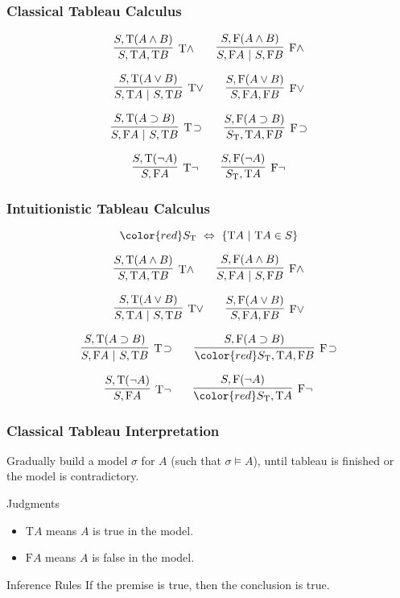 \documentclass[mathserif]{beamer}
\def\|{~|~}
\def\T{\textrm{T}}
\def\F{\textrm{F}}
\def\imp{\supset}
\def\dfn{~\Leftrightarrow~}
\newcommand{\diff}[1]{{\color{red} #1}}
\newcommand{\sat}[1]{\sigma \vDash #1}
\begin{document}
\begin{frame}
\frametitle{Classical Tableau Calculus}

$$
\infer
  [\T \land]
  {S , \T A , \T B}
{
  {S , \T(A \land B)}
}
\qquad
\infer
  [\F \land]
  {S, \F A \| S, \F B}
{
  {S, \F(A \land B)}
}
$$

$$
\infer
  [\T \lor]
  {S , \T A \| S , \T B}
{
  {S , \T(A \lor B)}
}
\qquad
\infer
  [\F \lor]
  {S, \F A , \F B}
{
  {S, \F(A \lor B)}
}
$$

$$
\infer
  [\T \! \imp]
  {S , \F A \| S , \T B}
{
  {S , \T(A \imp B)}
}
\qquad
\infer
  [\F \! \imp]
  {S_{\T}, \T A , \F B}
{
  {S, \F(A \imp B)}
}
$$

$$
\infer
  [\T \neg]
  {S , \F A}
{
  {S , \T(\neg A)}
}
\qquad
\infer
  [\F \neg]
  {S_{\T}, \T A}
{
  {S, \F(\neg A)}
}
$$

\end{frame}


\begin{frame}[label=calculus]
\frametitle{Intuitionistic Tableau Calculus}

$$
\diff{S_{\T} \dfn \{ \T A \| \T A \in S \}}
$$

$$
\infer
  [\T \land]
  {S , \T A , \T B}
{
  {S , \T(A \land B)}
}
\qquad
\infer
  [\F \land]
  {S, \F A \| S, \F B}
{
  {S, \F(A \land B)}
}
$$

$$
\infer
  [\T \lor]
  {S , \T A \| S , \T B}
{
  {S , \T(A \lor B)}
}
\qquad
\infer
  [\F \lor]
  {S, \F A , \F B}
{
  {S, \F(A \lor B)}
}
$$

$$
\infer
  [\T \! \imp]
  {S , \F A \| S , \T B}
{
  {S , \T(A \imp B)}
}
\qquad
\infer
  [\F \! \imp]
  {\diff{S_{\T}}, \T A , \F B}
{
  {S, \F(A \imp B)}
}
$$

$$
\infer
  [\T \neg]
  {S , \F A}
{
  {S , \T(\neg A)}
}
\qquad
\infer
  [\F \neg]
  {\diff{S_{\T}}, \T A}
{
  {S, \F(\neg A)}
}
$$

\end{frame}


\begin{frame}
\frametitle{Classical Tableau Interpretation}

Gradually build a model $\sigma$ for $A$ (such that $\sat{A}$),
until tableau is finished or the model is contradictory.

\begin{block}{Judgments}
\begin{itemize}
\item $\T A$ means $A$ is true in the model.
\item $\F A$ means $A$ is false in the model.
\end{itemize}
\end{block}

\begin{block}{Inference Rules}
If the premise is true, then the conclusion is true.
\end{block}

\end{frame}
\end{document}
